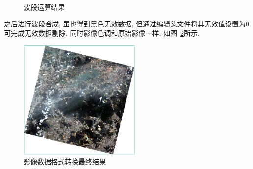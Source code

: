 \begin{figure}[!htbp]
    \centering
    \quad
    \quad
    \caption{波段运算结果}
    \label{fig:0205}
\end{figure}

之后进行波段合成, 虽也得到黑色无效数据, 但通过编辑头文件将其无效值设置为0可完成无效数据剔除, 同时影像色调和原始影像一样, 如图~\ref{fig:0206}所示. 

\begin{figure}[!htbp]
    \centering
    \includegraphics[height=16em]{pic/q0106.jpg}
    \caption{影像数据格式转换最终结果}
    \label{fig:0206}
\end{figure}


